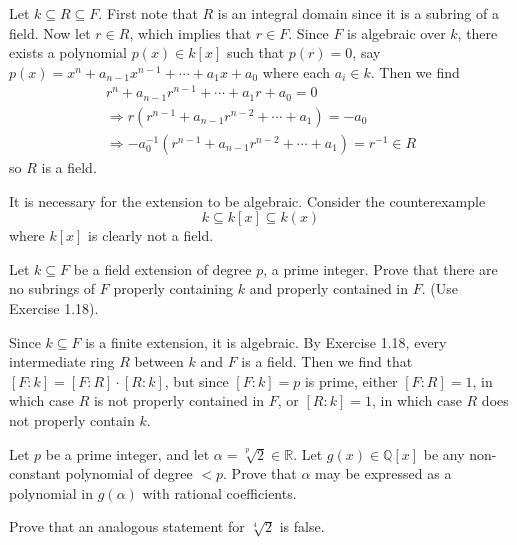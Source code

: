 \documentclass[../../master.tex]{subfiles}
\begin{document}
\begin{solution}
    Let $k \subseteq R \subseteq F$.
    First note that $R$ is an integral domain since it is a subring of a field.
    Now let $r \in R$, which implies that $r \in F$.
    Since $F$ is algebraic over $k$, there exists a polynomial $p(x) \in k[x]$ such that $p(r) = 0$, say $p(x) = x^{n} + a_{n-1}x^{n-1} + \cdots + a_1 x + a_0$ where each $a_i \in k$.
    Then we find
    \begin{gather*}
        r^{n} + a_{n-1} r^{n-1} + \cdots + a_1 r + a_0 = 0 \\
        \Longrightarrow r(r^{n-1} + a_{n-1}r^{n-2} + \cdots + a_1) = -a_0 \\
        \Longrightarrow -a_0^{-1} (r^{n-1} + a_{n-1}r^{n-2} + \cdots + a_1) = r^{-1} \in R
    \end{gather*}
    so $R$ is a field.

    It is necessary for the extension to be algebraic.
    Consider the counterexample
    \[
        k \subseteq k[x] \subseteq k(x)
    \]
    where $k[x]$ is clearly not a field.
\end{solution}

\begin{problem}
    Let $k \subseteq F$ be a field extension of degree $p$, a prime integer.
    Prove that there are no subrings of $F$ properly containing $k$ and properly contained in $F$.
    (Use Exercise 1.18).
\end{problem}

\begin{solution}
    Since $k \subseteq F$ is a finite extension, it is algebraic.
    By Exercise 1.18, every intermediate ring $R$ between $k$ and $F$ is a field.
    Then we find that $[F : k] = [F : R] \cdot [R : k]$, but since $[F : k] = p$ is prime, either $[F : R] = 1$, in which case $R$ is not properly contained in $F$, or $[R : k] = 1$, in which case $R$ does not properly contain $k$.
\end{solution}

\begin{problem}
    Let $p$ be a prime integer, and let $\alpha = \sqrt[p]{2} \in \mathbb{R}$.
    Let $g(x) \in \mathbb{Q}[x]$ be any non-constant polynomial of degree $< p$.
    Prove that $\alpha$ may be expressed as a polynomial in $g(\alpha)$ with rational coefficients.

    Prove that an analogous statement for $\sqrt[4]{2}$ is false.
\end{problem}
\end{document}

